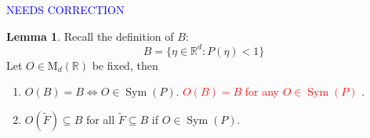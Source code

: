 \documentclass{article}
\theoremstyle{definition}
\newcommand\MdR{\mbox{M}_d(\mathbb{R})}
\newcommand\Sym{\operatorname{Sym}}
\newcommand{\R}{\mathbb{R}}
\theoremstyle{theorem}
\newtheorem{lemma}[theorem]{Lemma}
\begin{document}
\begin{framed}


\textcolor{blue}{NEEDS CORRECTION}















\begin{lemma}\label{lem:B}
Recall the definition of $B$:
\begin{equation*}
    B = \{ \eta\in \R^d : P(\eta) < 1 \}
\end{equation*}
Let $O\in \MdR{}$ be fixed, then 
\begin{enumerate}
    \item $O(B) = B \iff O\in \Sym{(P)}$. %
    \textcolor{red}{ $O(B)=B$ for any $O\in \Sym{(P)}$ }. 
    \item $ O(\widetilde{F}) \subseteq B$ for
    all $\widetilde{F}\subseteq B$ if  $O\in \Sym(P)$.
\end{enumerate}
\end{lemma}


\end{framed}
\end{document}
